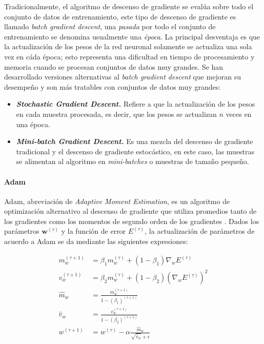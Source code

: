             Tradicionalmente, el algoritmo de descenso de gradiente se evalúa sobre todo el conjunto de datos de entrenamiento, 
            este tipo de descenso de gradiente es llamado \textit{batch gradient descent}, una \textit{pasada} por todo el conjunto 
            de entrenamiento se denomina usualmente una \textit{época}. La principal desventaja es que la 
            actualización de los pesos de la red neuronal solamente se actualiza una sola vez en cáda época; esto representa una 
            dificultad en tiempo de procesamiento y memoria cuando se procesan conjuntos de datos muy grandes. Se han desarrollado 
            versiones alternativas al \textit{batch gradient descent} que mejoran su desempeño y son más tratables con 
            conjuntos de datos muy grandes:

            \begin{itemize}
                \item \textbf{\textit{Stochastic Gradient Descent.}} Refiere a que la actualización de los pesos en cada muestra procesada, es decir, que los pesos se actualizan $n$ veces en una época.
                \item \textbf{\textit{Mini-batch Gradient Descent.}} Es una mezcla del descenso de gradiente tradicional y el descenso de gradiente estocástico, en este caso, las muestras se alimentan al algoritmo en \textit{mini-batches} o muestras de tamaño pequeño.
            \end{itemize}
        
            \paragraph{Adam}
            Adam, abreviación de \textit{Adaptive Moment Estimation}, es un algoritmo de optimización alternativo al descenso de 
            gradiente que utiliza promedios tanto de los gradientes como los momentos de segundo orden de los gradientes \cite{kingma2014adam}. Dados 
            los parámetros $\mathbf{w}^{(\tau)}$ y la función de error $E^{(\tau)}$, la actualización de parámetros de acuerdo 
            a Adam se da mediante las siguientes expresiones:

            \begin{align}
                m_w^{(\tau + 1)} &= \beta_1 m_w^{(\tau)} + (1 - \beta_1) \nabla_w E^{(\tau)} \nonumber \\
                v_w^{(\tau + 1)} &= \beta_2 m_w^{(\tau)} + (1 - \beta_2) (\nabla_w E^{(\tau)})^2 \nonumber \\
                \hat{m}_w &= \frac{m_w^{(\tau + 1)}}{1 - (\beta_1)^{(\tau + 1)} } \nonumber \\
                \hat{v}_w &= \frac{v_w^{(\tau + 1)}}{1 - (\beta_2)^{(\tau + 1)} } \nonumber \\
                w^{(\tau + 1)} &= w^{(\tau)} - \alpha \frac{\hat{m}_w}{\sqrt{\hat{v}_w} + \epsilon} \label{eq:adam}
            \end{align}

